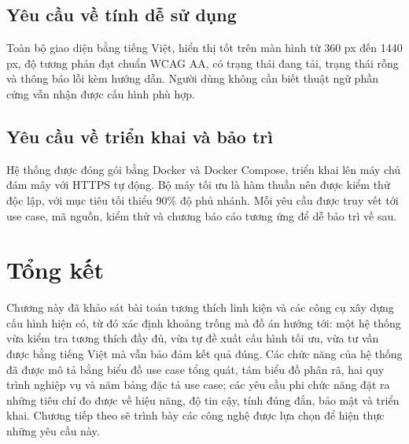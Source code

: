 \subsection{Yêu cầu về tính dễ sử dụng}
Toàn bộ giao diện bằng tiếng Việt, hiển thị tốt trên màn hình từ 360 px đến 1440 px, độ tương phản đạt chuẩn WCAG AA, có trạng thái đang tải, trạng thái rỗng và thông báo lỗi kèm hướng dẫn. Người dùng không cần biết thuật ngữ phần cứng vẫn nhận được cấu hình phù hợp.

\subsection{Yêu cầu về triển khai và bảo trì}
Hệ thống được đóng gói bằng Docker và Docker Compose, triển khai lên máy chủ đám mây với HTTPS tự động. Bộ máy tối ưu là hàm thuần nên được kiểm thử độc lập, với mục tiêu tối thiểu 90\% độ phủ nhánh. Mỗi yêu cầu được truy vết tới use case, mã nguồn, kiểm thử và chương báo cáo tương ứng để dễ bảo trì về sau.

\section{Tổng kết}

Chương này đã khảo sát bài toán tương thích linh kiện và các công cụ xây dựng cấu hình hiện có, từ đó xác định khoảng trống mà đồ án hướng tới: một hệ thống vừa kiểm tra tương thích đầy đủ, vừa tự đề xuất cấu hình tối ưu, vừa tư vấn được bằng tiếng Việt mà vẫn bảo đảm kết quả đúng. Các chức năng của hệ thống đã được mô tả bằng biểu đồ use case tổng quát, tám biểu đồ phân rã, hai quy trình nghiệp vụ và năm bảng đặc tả use case; các yêu cầu phi chức năng đặt ra những tiêu chí đo được về hiệu năng, độ tin cậy, tính đúng đắn, bảo mật và triển khai. Chương tiếp theo sẽ trình bày các công nghệ được lựa chọn để hiện thực những yêu cầu này.
